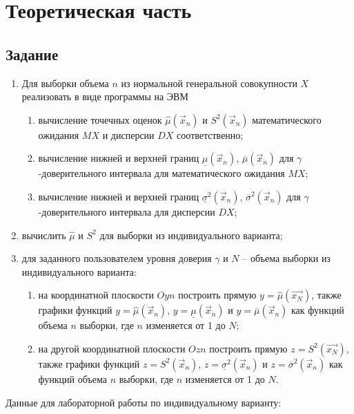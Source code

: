 \setcounter{page}{3}
\chapter{Теоретическая часть}

\section{Задание}


\begin{enumerate}
	\item Для выборки объема $n$ из нормальной генеральной совокупности $X$ реализовать в виде программы на ЭВМ
	\begin{enumerate}
		\item вычисление точечных оценок $\hat\mu(\vec x_n)$ и $S^2(\vec x_n)$ математического ожидания $MX$ и дисперсии $DX$ соответственно;
		\item вычисление нижней и верхней границ $\underline\mu(\vec x_n)$, $\overline\mu(\vec x_n)$ для $\gamma$-доверительного интервала для математического ожидания $MX$;
		\item вычисление нижней и верхней границ $\underline\sigma^2(\vec x_n)$, $\overline\sigma^2(\vec x_n)$ для $\gamma$-доверительного интервала для дисперсии $DX$;
	\end{enumerate}
	\item вычислить $\hat\mu$ и $S^2$ для выборки из индивидуального варианта;
	\item для заданного пользователем уровня доверия $\gamma$ и $N$ – объема выборки из индивидуального варианта:
	\begin{enumerate}
		\item на координатной плоскости $Oyn$ построить прямую $y = \hat\mu(\vec{x_N})$, также графики функций $y = \hat\mu(\vec x_n)$, $y = \underline\mu(\vec x_n)$ и $y = \overline\mu(\vec x_n)$ как функций объема $n$ выборки, где $n$ изменяется от 1 до $N$;
		\item на другой координатной плоскости $Ozn$ построить прямую $z = S^2(\vec{x_N})$, также графики функций $z = S^2(\vec x_n)$, $z = \underline\sigma^2(\vec x_n)$ и $z = \overline\sigma^2(\vec x_n)$ как функций объема $n$ выборки, где $n$ изменяется от 1 до $N$.
	\end{enumerate}
\end{enumerate}


Данные для лабораторной работы по индивидуальному варианту:


